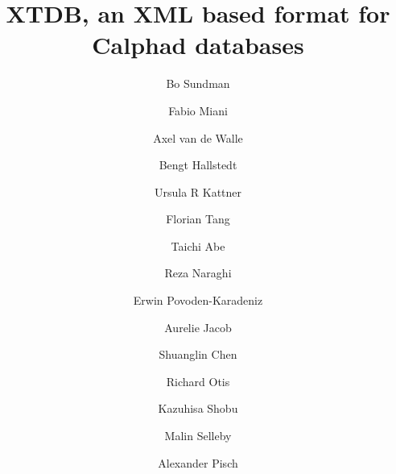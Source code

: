 \documentclass[preprint,review,12pt]{elsarticle}
\begin{document}



\title{XTDB, an XML based format for Calphad databases}



  \author[bosse]{Bo Sundman}       %
  \author[fabio]{Fabio Miani}      %
  \author[alex]{Axel van de Walle} %
  \author[bengt]{Bengt Hallstedt}  %
  \author[urk]{Ursula R Kattner}   %
  \author[gtt]{Florian Tang}       %
  \author[abe]{Taichi Abe}         %
  \author[tcsab]{Reza Naraghi}      %
  \author[tuwien]{Erwin Povoden-Karadeniz} %
  \author[tuwien]{Aurelie Jacob}  %
  \author[computherm]{Shuanglin Chen} %
  \author[richard]{Richard Otis}   %
  \author[shobu]{Kazuhisa Shobu}   %
  \author[kth]{Malin Selleby}      %
  \author[simap]{Alexander Pisch} %
\end{document}
